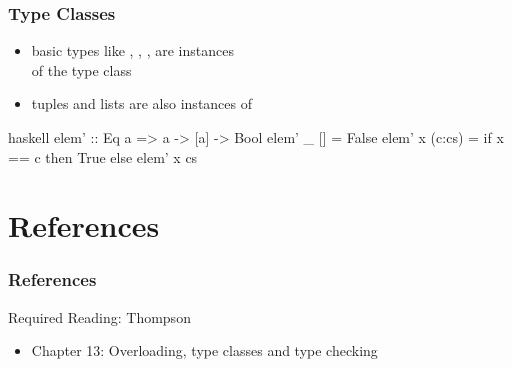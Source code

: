 \documentclass[dvipsnames]{beamer}
\theoremstyle{plain}
\begin{document}
\begin{frame}[fragile]
  \frametitle{Type Classes}

  \begin{itemize}
    \item basic types like , ,
      ,  are instances\\
      of the type class 
    \item tuples and lists are also instances of 
  \end{itemize}

  \pause
  \begin{exampleblock}{}
    \begin{pygments}{haskell}
elem' :: Eq a => a -> [a] -> Bool
elem' _ []     = False
elem' x (c:cs) = if x == c then True else elem' x cs
    \end{pygments}
  \end{exampleblock}
\end{frame}

\section*{References}

\begin{frame}
  \frametitle{References}

  \begin{block}{Required Reading: Thompson}
    \begin{itemize}
      \item Chapter 13: \alert{Overloading, type classes and type checking}
    \end{itemize}
  \end{block}
\end{frame}
\end{document}
